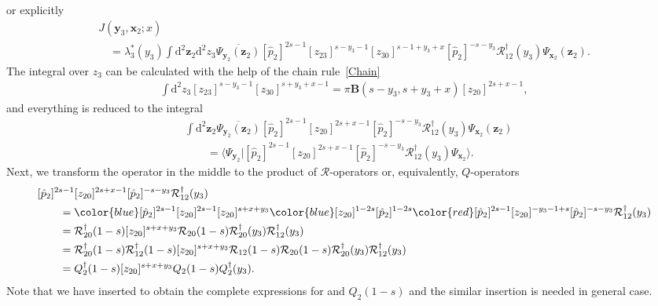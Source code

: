 \documentclass[pdftex]{sigma}
\newcommand{\blue}{\color{blue}}
\newcommand{\red}{\color{red}}
\newcommand{\II}{\hbox{{1}\kern-.25em\hbox{l}}}
\numberwithin{equation}{section}
\begin{document}
or explicitly
\begin{gather*}
J(\bm{y}_3,\bm{x}_2;x) \\
\quad =
\lambda_3^\ast(y_3)
\int
\mathrm{d}^{2}\bm{z}_2
\mathrm{d}^{2} z_3
\overline{\Psi_{\bm{y}_2}(\bm{z}_2)}
[\hat{p}_2]^{2s-1} [z_{23}]^{s-y_3-1} [z_{30}]^{s-1+y_3+x}
[\hat{p}_2]^{-s-y_3}
\mathcal{R}^{\dagger}_{12}(y_3) \Psi_{\bm{x}_2}(\bm{z}_2).
\end{gather*}
The integral over $z_3$ can be calculated with the help of the
chain rule~\eqref{Chain}
\begin{align*}
\int \mathrm{d}^2 z_3 [z_{23}]^{s-y_3-1} [z_{30}]^{s+y_3+x-1} =
\pi \mathbf{B}(s-y_3,s+y_3+x)
[z_{20}]^{2s+x-1},
\end{align*}
and everything is reduced to the integral
\begin{align*}
&
\int
\mathrm{d}^{2}\bm{z}_2
\overline{\Psi_{\bm{y}_2}(\bm{z}_2)}
[\hat{p}_2]^{2s-1} [z_{20}]^{2s+x-1}
[\hat{p}_2]^{-s-y_3}
\mathcal{R}^{\dagger}_{12}(y_3) \Psi_{\bm{x}_2}(\bm{z}_2) \\
& \qquad =
\bigl\langle \Psi_{\bm{y}_2}|
[\hat{p}_2]^{2s-1} [z_{20}]^{2s+x-1}
[\hat{p}_2]^{-s-y_3}
\mathcal{R}^{\dagger}_{12}(y_3) \Psi_{\bm{x}_2}
\bigr\rangle .
\end{align*}
Next, we transform the operator in the middle to
the product of $\mathcal{R}$-operators or, equivalently, $Q$-operators
\begin{align*}
&
[\hat{p}_2]^{2s-1} [z_{20}]^{2s+x-1}
[\hat{p}_2]^{-s-y_3} \mathcal{R}^{\dagger}_{12}(y_3) \\
&\qquad{} =
{\blue [\hat{p}_2]^{2s-1} [z_{20}]^{2s-1}}
[z_{20}]^{s+x+y_3}
{\blue [z_{20}]^{1-2s} [\hat{p}_2]^{1-2s}}
{\red [\hat{p}_2]^{2s-1} [z_{20}]^{-y_3-1+s}
[\hat{p}_2]^{-s-y_3}} \mathcal{R}^{\dagger}_{12}(y_3) \\
&\qquad{} =
\mathcal{R}^{\dagger}_{20}(1-s)
[z_{20}]^{s+x+y_3}
\mathcal{R}_{20}(1-s)
\mathcal{R}^{\dagger}_{20}(y_3)
\mathcal{R}^{\dagger}_{12}(y_3) \\
&\qquad{} =
\mathcal{R}^{\dagger}_{20}(1-s) \mathcal{R}^{\dagger}_{12}(1-s)
[z_{20}]^{s+x+y_3}
\mathcal{R}_{12}(1-s) \mathcal{R}_{20}(1-s)
\mathcal{R}^{\dagger}_{20}(y_3)
\mathcal{R}^{\dagger}_{12}(y_3) \\
&\qquad{} =
Q^{\dagger}_2(1-s)
[z_{20}]^{s+x+y_3}
Q_2(1-s) Q^{\dagger}_2(y_3) .
\end{align*}
Note that we have inserted
\smash{$\mathcal{R}^{\dagger}_{12}(1-s) \mathcal{R}_{12}(1-s) = \II$}
to obtain the complete expressions for 
and $Q_2(1-s)$ and the similar insertion is needed in general case.
\end{document}
